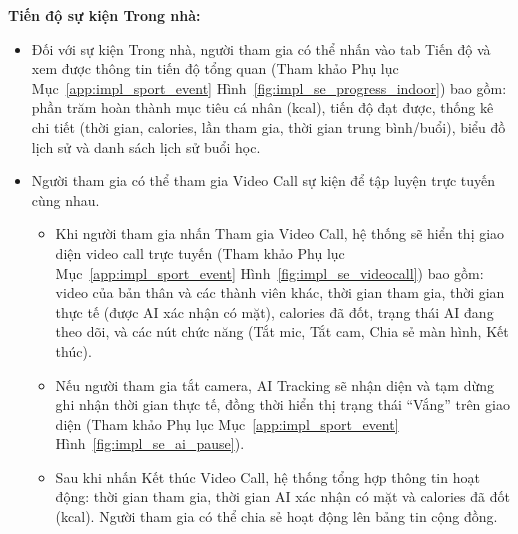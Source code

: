\textbf{Tiến độ sự kiện Trong nhà:}
\begin{itemize}
    \item Đối với sự kiện Trong nhà, người tham gia có thể nhấn vào tab Tiến độ và xem được thông tin tiến độ tổng quan (Tham khảo Phụ lục Mục~\ref{app:impl_sport_event} Hình~\ref{fig:impl_se_progress_indoor}) bao gồm: phần trăm hoàn thành mục tiêu cá nhân (kcal), tiến độ đạt được, thống kê chi tiết (thời gian, calories, lần tham gia, thời gian trung bình/buổi), biểu đồ lịch sử và danh sách lịch sử buổi học.


    \item Người tham gia có thể tham gia Video Call sự kiện để tập luyện trực tuyến cùng nhau.
    \begin{itemize}
        \item Khi người tham gia nhấn Tham gia Video Call, hệ thống sẽ hiển thị giao diện video call trực tuyến (Tham khảo Phụ lục Mục~\ref{app:impl_sport_event} Hình~\ref{fig:impl_se_videocall}) bao gồm: video của bản thân và các thành viên khác, thời gian tham gia, thời gian thực tế (được AI xác nhận có mặt), calories đã đốt, trạng thái AI đang theo dõi, và các nút chức năng (Tắt mic, Tắt cam, Chia sẻ màn hình, Kết thúc).


        \item Nếu người tham gia tắt camera, AI Tracking sẽ nhận diện và tạm dừng ghi nhận thời gian thực tế, đồng thời hiển thị trạng thái ``Vắng'' trên giao diện (Tham khảo Phụ lục Mục~\ref{app:impl_sport_event} Hình~\ref{fig:impl_se_ai_pause}).


        \item Sau khi nhấn Kết thúc Video Call, hệ thống tổng hợp thông tin hoạt động: thời gian tham gia, thời gian AI xác nhận có mặt và calories đã đốt (kcal). Người tham gia có thể chia sẻ hoạt động lên bảng tin cộng đồng.

    \end{itemize}
\end{itemize}

